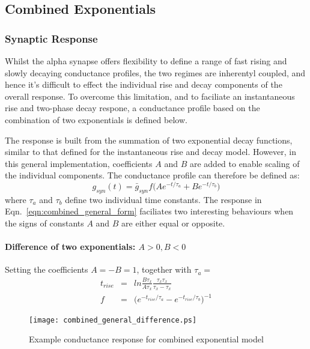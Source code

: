 \documentclass[12pt]{article}
\begin{document}
\subsection{Combined Exponentials}
\subsubsection*{Synaptic Response}
Whilst the alpha synapse offers flexibility to define a range of fast rising and
slowly decaying conductance profiles, the two regimes are inherentyl coupled,
and hence it's difficult to effect the individual rise and decay components of
the overall response. To overcome this limitation, and to faciliate
an instantaneous rise and two-phase decay respone, a conductance profile based
on the combination of two exponentials is defined below.

The response is built from the summation of two exponential decay functions,
similar to that defined for the instantaneous rise and decay model. However, in
this general implementation, coefficients $A$ and $B$ are added to enable
scaling of the individual components. The conductance profile can therefore be
defined as:
\begin{equation}
g_{syn}(t)=\bar{g}_{syn}f\Big(Ae^{-t / \tau_a} + Be^{-t / \tau_b}\Big)
\label{eqn:combined_general_form}
\end{equation}
where $\tau_a$ and $\tau_b$ define two individual time constants. The response
in Eqn.~\ref{eqn:combined_general_form} faciliates two interesting behaviours
when the signs of constants $A$ and $B$ are either equal or opposite.

\paragraph{Difference of two exponentials: $A>0, B<0$}
Setting the coefficients $A = -B = 1$, together with $\tau_a = $
\
\begin{eqnarray}
t_{rise}&=&ln\frac{B\tau_x}{A\tau_x}\frac{\tau_x\tau_x}{\tau_x - \tau_x} \\
f&=&\Big( e^{-t_{rise} / \tau_a} - e^{-t_{rise} / \tau_b}\Big)^{-1}
\label{eqn:combined_exponential_response}
\end{eqnarray}
\begin{figure}[!h]
\begin{centering}
\texttt{[image: combined\_general\_difference.ps]}
\caption{Example conductance response for combined exponential model}
\label{fig:combined_exp_example}
\end{centering}
\end{figure}
\end{document}
